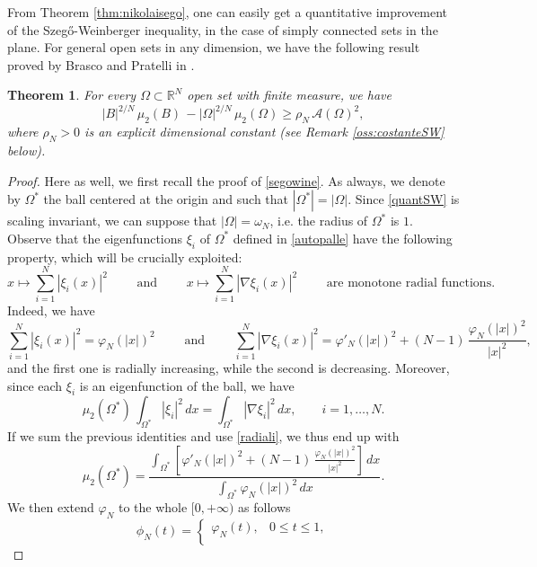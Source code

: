 \documentclass{amsart}
\newtheorem{theorem}[lemma]{Theorem}
\theoremstyle{definition}
\numberwithin{equation}{section}
\begin{document}
From Theorem \ref{thm:nikolaisego}, one can easily get a quantitative improvement of the Szeg\H{o}-Weinberger inequality, in the case of simply connected sets in the plane. 
For general open sets in any dimension, we have the following result proved by Brasco and Pratelli in \cite[Theorem 4.1]{MR2899684}.
\begin{theorem}
\label{th:quanto_sw}
For every $\Omega\subset\mathbb{R}^N$ open set with finite measure, we have
\begin{equation}
\label{quantSW}
|B|^{2/N}\,\mu_2(B)\, -|\Omega|^{2/N}\,\mu_2(\Omega)\ge \rho_N\, \mathcal{A}(\Omega)^2,
\end{equation}
where $\rho_N>0$ is an explicit dimensional constant (see Remark \ref{oss:costanteSW} below).
\end{theorem}
\begin{proof}
Here as well, we first recall the proof of \eqref{segowine}.
As always, we denote by $\Omega^*$ the ball centered at the origin and such that $|\Omega^*|=|\Omega|$. Since \eqref{quantSW} is scaling invariant, we can suppose that $|\Omega|=\omega_N$, i.e. the radius of $\Omega^*$ is $1$. Observe that the eigenfunctions $\xi_i$ of $\Omega^*$ defined in \eqref{autopalle} have the following property, which will be crucially exploited:
\[
x\mapsto \sum_{i=1}^N |\xi_i(x)|^2\qquad \mbox{ and }\qquad x\mapsto \sum_{i=1}^N |\nabla \xi_i(x)|^2\qquad \mbox{ are monotone radial functions}.
\]
Indeed, we have
\begin{equation}
\label{radiali}
\sum_{i=1}^N |\xi_i(x)|^2=\varphi_N(|x|)^2 \qquad \mbox{ and }\qquad \sum_{i=1}^N |\nabla \xi_i(x)|^2=\varphi'_N(|x|)^2+(N-1)\, \frac{\varphi_N(|x|)^2}{|x|^2},
\end{equation}
and the first one is radially increasing, while the second is decreasing.
Moreover, since each $\xi_i$ is an eigenfunction of the ball, we have
\[
\mu_2(\Omega^*)\, \int_{\Omega^*} |\xi_i|^2\,dx=\int_{\Omega^*} |\nabla \xi_i|^2\,dx,\qquad i=1,\dots,N.
\]
If we sum the previous identities and use \eqref{radiali}, we thus end up with
\begin{equation}
\label{palla}
\mu_2(\Omega^*)=\frac{\displaystyle\int_{\Omega^*} \left[\varphi'_N(|x|)^2+(N-1)\,\frac{\varphi_N(|x|)^2}{|x|^2}\right]\, dx}{\displaystyle\int_{\Omega^*}\varphi_N(|x|)^2\, dx}.
\end{equation}
We then extend $\varphi_N$ to the whole $[0,+\infty)$ as follows
\[
\phi_N(t)=\left\{\begin{array}{rl}
\varphi_N(t),& 0\le t\le 1,\\

\end{array}\]
\end{proof}
\end{document}
